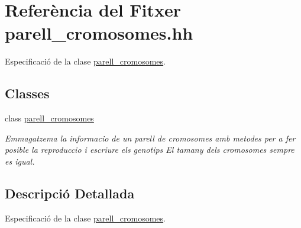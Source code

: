 \hypertarget{parell__cromosomes_8hh}{}\section{Referència del Fitxer parell\+\_\+cromosomes.\+hh}
\label{parell__cromosomes_8hh}


Especificació de la clase \hyperlink{classparell__cromosomes}{parell\+\_\+cromosomes}.  


\subsection*{Classes}
\begin{DoxyCompactItemize}
\item 
class \hyperlink{classparell__cromosomes}{parell\+\_\+cromosomes}
\begin{DoxyCompactList}\small\item\em Emmagatzema la informacio de un parell de cromosomes amb metodes per a fer posible la reproduccio i escriure els genotips El tamany dels cromosomes sempre es igual. \end{DoxyCompactList}\end{DoxyCompactItemize}


\subsection{Descripció Detallada}
Especificació de la clase \hyperlink{classparell__cromosomes}{parell\+\_\+cromosomes}. 

